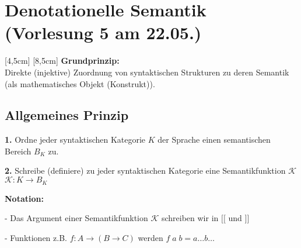 \section{Denotationelle Semantik \small (Vorlesung 5 am 22.05.)}
[4,5cm]
[8,5cm]
\textbf{Grundprinzip:} \\Direkte (injektive) Zuordnung von syntaktischen Strukturen zu deren Semantik (als mathematisches Objekt (Konstrukt)).
\subsection{Allgemeines Prinzip}
	\begin{compactitem}
		\item[\textbf{1.}] Ordne jeder syntaktischen Kategorie $K$ der Sprache einen semantischen Bereich $B_K$ zu.
		\item[\textbf{2.}] Schreibe (definiere) zu jeder syntaktischen Kategorie eine Semantikfunktion $\mathcal{K}$\\
		$\mathcal{K}:K \rightarrow B_K$
	\end{compactitem}
	\textbf{Notation:}
	\begin{compactitem}
		\item[-] Das Argument einer Semantikfunktion $\mathcal{K}$ schreiben wir in $
[\![$ und $]\!]$
		\item[-] Funktionen z.B. $f: A \rightarrow (B \rightarrow C)$ werden $f\;a\;b = a \dots b \dots $ 
	\end{compactitem}

